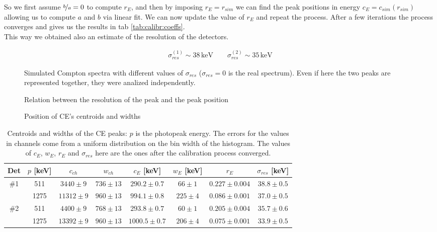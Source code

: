 \documentclass[11pt,a4 paper]{article}
\let\oldfrac\frac
\renewcommand{\frac}[3][d]{\ifthenelse{\equal{#1}{d}}{\oldfrac{#2}{#3}}{\nicefrac{#2}{#3}}}
\begin{document}
So we first assume $\frac[f]{b}{a} = 0$ to compute $r_E$, and then by imposing $r_E = r_{sim}$ we can find the peak positions in energy $c_E = c_{sim}(r_{sim})$ allowing us to compute $a$ and $b$ via linear fit. We can now update the value of $r_E$ and repeat the process. After a few iterations the process converges and gives us the results in tab \ref{tab:calibr:coeffs}.\\
This way we obtained also an estimate of the resolution of the detectors.

\begin{gather*}
  \sigma_{res}^{(1)} \sim 38\, \text{keV} \qquad
  \sigma_{res}^{(2)} \sim 35\, \text{keV}
\end{gather*}


\begin{figure}
  \centering
  \caption{Simulated Compton spectra with different values of $\sigma_{res}$ ($\sigma_{res} = 0$ is the real spectrum). Even if here the two peaks are represented together, they were analized independently.}
  \label{fig:sim:spectra}
\end{figure}

\begin{figure}
    \centering
    \caption{Relation between the resolution of the peak and the peak position}
    \label{fig:sim}
\end{figure}

\begin{figure}
    \centering
    \caption{Position of CE's centroids and widths}
    \label{fig:det12:calibr}
\end{figure}

\begin{table}
  \centering
  \begin{tabular}{cccccccc}
    \toprule
    Det & $p$ [keV] & $c_{ch}$ & $w_{ch}$ & $c_E$ [keV] & $w_E$ [keV] & $r_E$ & $\sigma_{res}$ [keV]\\
    \midrule
    \#1 & 511 & $3440 \pm 9$ & $736 \pm 13$ & $290.2 \pm 0.7$ & $66 \pm 1$ & $0.227 \pm 0.004$ & $38.8 \pm 0.5$ \\
        & 1275 & $11312 \pm 9$ & $960 \pm 13$ & $994.1 \pm 0.8$ & $225 \pm 4$ & $0.086 \pm 0.001$ & $37.0 \pm 0.5$ \\
    \#2 & 511 & $4400 \pm 9$ & $768 \pm 13$ & $293.8 \pm 0.7$ & $60 \pm 1$ & $0.205 \pm 0.004$ & $35.7 \pm 0.6$ \\
        & 1275 & $13392 \pm 9$ & $960 \pm 13$ & $1000.5 \pm 0.7$ & $206 \pm 4$ & $0.075 \pm 0.001$ & $33.9 \pm 0.5$ \\
    \bottomrule
  \end{tabular}
  \caption{Centroids and widths of the CE peaks: $p$ is the photopeak energy. The errors for the values in channels come from a uniform distribution on the bin width of the histogram. The values of $c_E$, $w_E$, $r_E$ and $\sigma_{res}$ here are the ones after the calibration process converged.}
  \label{tab:calibr:fits}
\end{table}
\end{document}

